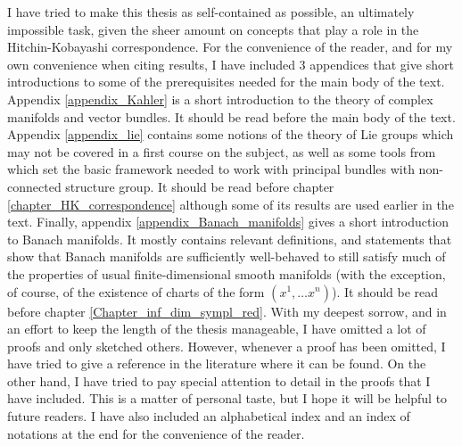 I have tried to make this thesis as self-contained as possible, an ultimately impossible task, given the sheer amount on concepts that play a role in the Hitchin-Kobayashi correspondence. For the convenience of the reader, and for my own convenience when citing results, I have included 3 appendices that give short introductions to some of the prerequisites needed for the main body of the text. Appendix \ref{appendix_Kahler} is a short introduction to the theory of complex manifolds and vector bundles. It should be read before the main body of the text. Appendix \ref{appendix_lie} contains some notions of the theory of Lie groups which may not be covered in a first course on the subject, as well as some tools from \parencite{barajas2023non} which set the basic framework needed to work with principal bundles with non-connected structure group. It should be read before chapter \ref{chapter_HK_correspondence} although some of its results are used earlier in the text. Finally, appendix \ref{appendix_Banach_manifolds} gives a short introduction to Banach manifolds. It mostly contains relevant definitions, and statements that show that Banach manifolds are sufficiently well-behaved to still satisfy much of the properties of usual finite-dimensional smooth manifolds (with the exception, of course, of the existence of charts of the form \((x^1, \ldots x^n)\)). It should be read before chapter \ref{Chapter_inf_dim_sympl_red}. With my deepest sorrow, and in an effort to keep the length of the thesis manageable, I have omitted a lot of proofs and only sketched others. However, whenever a proof has been omitted, I have tried to give a reference in the literature where it can be found. On the other hand, I have tried to pay special attention to detail in the proofs that I have included. This is a matter of personal taste, but I hope it will be helpful to future readers. I have also included an alphabetical index and an index of notations at the end for the convenience of the reader. \\

